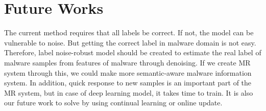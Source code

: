 \section{Future Works}

The current method requires that all labels be correct. If not, the model can be vulnerable to noise. But getting the correct label in malware domain is not easy. Therefore, label noise-robust model should be created to estimate the real label of malware samples from features of malware through denoising. If we create MR system through this, we could make more semantic-aware malware information system. In addition, quick response to new samples is an important part of the MR system, but in case of deep learning model, it takes time to train. It is also our future work to solve by using continual learning or online update.